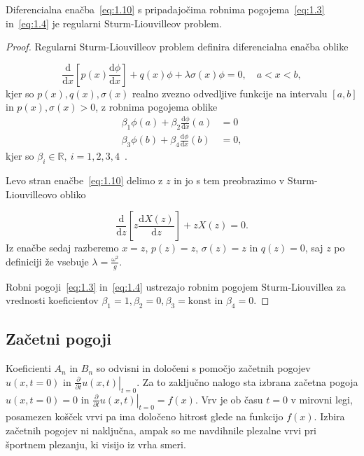 \begin{trditev}
  Diferencialna enačba~\eqref{eq:1.10} s pripadajočima robnima pogojema~\eqref{eq:1.3} in~\eqref{eq:1.4} je regularni Sturm-Liouvilleov problem.
\end{trditev}
\begin{proof}
  Regularni Sturm-Liouvilleov problem definira diferencialna enačba oblike

  \[ \frac{\mathrm{d} }{\mathrm{d} x} \left[ p(x) \frac{\mathrm{d} \phi}{\mathrm{d} x} \right] + q(x) \phi + \lambda \sigma(x) \phi = 0, \quad a < x < b,
  \]
  kjer so \( p(x), q(x), \sigma(x) \) realno zvezno odvedljive funkcije na intervalu \( [a, b] \) in \( p(x), \sigma(x) > 0 \), z robnima pogojema oblike
  \begin{align*}
    \beta_1 \phi(a) + \beta_2 \frac{\mathrm{d} \phi}{\mathrm{d} x} (a) &= 0 \\
    \beta_3 \phi(b) + \beta_4 \frac{\mathrm{d} \phi}{\mathrm{d} x} (b) &= 0,
  \end{align*}
  kjer so \( \beta_i \in \mathbb{R}, \ i = 1, 2, 3, 4 \)~\cite{haberman_applied_2004}.

  Levo stran enačbe~\eqref{eq:1.10} delimo z \( z \) in jo s tem preobrazimo v Sturm-Liouvilleovo obliko

  \[ \frac{\mathrm{d} }{\mathrm{d} z} \left[ z \frac{\mathrm{d} X(z)}{\mathrm{d} z} \right] + z X(z) = 0.
  \]
  Iz enačbe sedaj razberemo \( x = z \), \( p(z) = z \), \( \sigma(z) = z \) in \( q(z) = 0 \), saj \( z \) po definiciji že vsebuje \( \lambda = \frac{\omega ^2}{g} \).

  Robni pogoji~\eqref{eq:1.3} in~\eqref{eq:1.4} ustrezajo robnim pogojem Sturm-Liouvillea za vrednosti koeficientov \( \beta_1 = 1, \beta_2 = 0, \beta_3 = \mathrm{konst} \) in \( \beta_4 = 0 \).
\end{proof}

\subsection{Začetni pogoji}

Koeficienti \( A_n \) in \( B_n \) so odvisni in določeni s pomočjo začetnih pogojev \( u(x, t = 0) \) in \( \left. \frac{\partial }{\partial t} u(x, t ) \right|_{t = 0} \). Za to zaključno nalogo sta izbrana začetna pogoja \( u(x, t = 0 ) = 0 \) in \( \left. \frac{\partial }{\partial t} u(x, t) \right|_{t= 0} = f(x) \). Vrv je ob času \( t = 0 \) v mirovni legi, posamezen košček vrvi pa ima določeno hitrost glede na funkcijo \( f(x) \). Izbira začetnih pogojev ni naključna, ampak so me navdihnile plezalne vrvi pri športnem plezanju, ki visijo iz vrha smeri.

